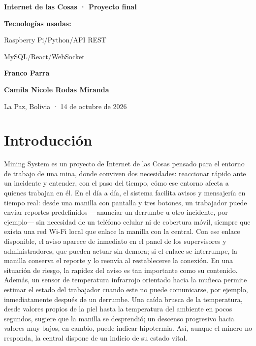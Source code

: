 \documentclass[10pt,a4paper]{article}
\begin{document}
\begin{titlepage}
\begin{minipage}[t][.90\textheight][t]{.88\textwidth}
\vspace{6mm}
{\small\bfseries Internet de las Cosas · Proyecto final}\par
\vspace{6mm}
{\small\bfseries\color{Sand} Tecnologías usadas:}\par
\vspace{2mm}
{\small Raspberry Pi\enspace /\enspace Python\enspace /\enspace API REST}\par
{\small MySQL\enspace /\enspace React\enspace /\enspace WebSocket}\par
\vfill
{\large\bfseries Franco Parra}\par
{\large\bfseries Camila Nicole Rodas Miranda}\par
{\small La Paz, Bolivia · 14 de octubre de 2026}\par
\vspace{12mm}
\end{minipage}
\end{titlepage}
\clearpage\tableofcontents
\clearpage{}

\section{Introducción}
\label{sec:introduccion}
Mining System es un proyecto de Internet de las Cosas pensado para el entorno de trabajo de una mina, donde conviven dos necesidades: reaccionar rápido ante un incidente y entender, con el paso del tiempo, cómo ese entorno afecta a quienes trabajan en él. En el día a día, el sistema facilita avisos y mensajería en tiempo real: desde una manilla con pantalla y tres botones, un trabajador puede enviar reportes predefinidos —anunciar un derrumbe u otro incidente, por ejemplo— sin necesidad de un teléfono celular ni de cobertura móvil, siempre que exista una red Wi-Fi local que enlace la manilla con la central. Con ese enlace disponible, el aviso aparece de inmediato en el panel de los supervisores y administradores, que pueden actuar sin demora; si el enlace se interrumpe, la manilla conserva el reporte y lo reenvía al restablecerse la conexión. En una situación de riesgo, la rapidez del aviso es tan importante como su contenido. Además, un sensor de temperatura infrarrojo orientado hacia la muñeca permite estimar el estado del trabajador cuando este no puede comunicarse, por ejemplo, inmediatamente después de un derrumbe. Una caída brusca de la temperatura, desde valores propios de la piel hasta la temperatura del ambiente en pocos segundos, sugiere que la manilla se desprendió; un descenso progresivo hacia valores muy bajos, en cambio, puede indicar hipotermia. Así, aunque el minero no responda, la central dispone de un indicio de su estado vital.
\end{document}
